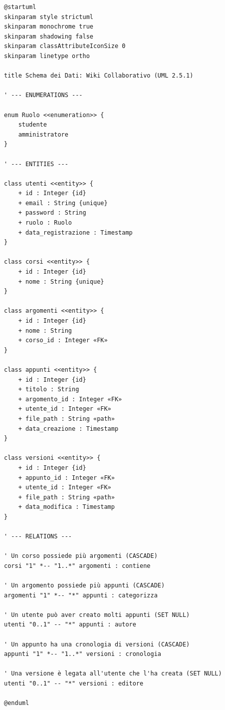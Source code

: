 \begin{verbatim}
@startuml
skinparam style strictuml
skinparam monochrome true
skinparam shadowing false
skinparam classAttributeIconSize 0
skinparam linetype ortho

title Schema dei Dati: Wiki Collaborativo (UML 2.5.1)

' --- ENUMERATIONS ---

enum Ruolo <<enumeration>> {
    studente
    amministratore
}

' --- ENTITIES ---

class utenti <<entity>> {
    + id : Integer {id}
    + email : String {unique}
    + password : String
    + ruolo : Ruolo
    + data_registrazione : Timestamp
}

class corsi <<entity>> {
    + id : Integer {id}
    + nome : String {unique}
}

class argomenti <<entity>> {
    + id : Integer {id}
    + nome : String
    + corso_id : Integer «FK»
}

class appunti <<entity>> {
    + id : Integer {id}
    + titolo : String
    + argomento_id : Integer «FK»
    + utente_id : Integer «FK»
    + file_path : String «path»
    + data_creazione : Timestamp
}

class versioni <<entity>> {
    + id : Integer {id}
    + appunto_id : Integer «FK»
    + utente_id : Integer «FK»
    + file_path : String «path»
    + data_modifica : Timestamp
}

' --- RELATIONS ---

' Un corso possiede più argomenti (CASCADE)
corsi "1" *-- "1..*" argomenti : contiene

' Un argomento possiede più appunti (CASCADE)
argomenti "1" *-- "*" appunti : categorizza

' Un utente può aver creato molti appunti (SET NULL)
utenti "0..1" -- "*" appunti : autore

' Un appunto ha una cronologia di versioni (CASCADE)
appunti "1" *-- "1..*" versioni : cronologia

' Una versione è legata all'utente che l'ha creata (SET NULL)
utenti "0..1" -- "*" versioni : editore

@enduml


\end{verbatim}